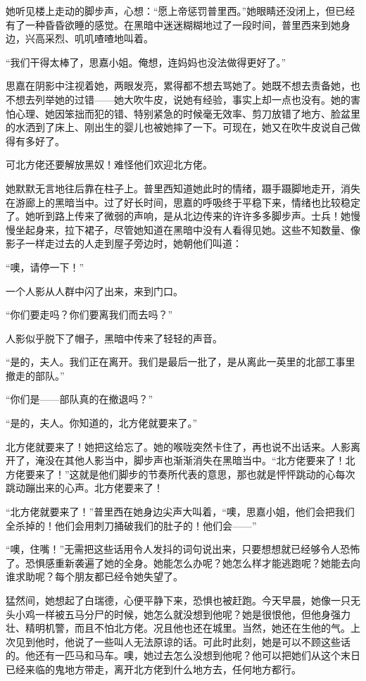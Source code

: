 \par 她听见楼上走动的脚步声，心想：“愿上帝惩罚普里西。”她眼睛还没闭上，但已经有了一种昏昏欲睡的感觉。在黑暗中迷迷糊糊地过了一段时间，普里西来到她身边，兴高采烈、叽叽喳喳地叫着。
\par “我们干得太棒了，思嘉小姐。俺想，连妈妈也没法做得更好了。”
\par 思嘉在阴影中注视着她，两眼发亮，累得都不想去骂她了。她既不想去责备她，也不想去列举她的过错——她大吹牛皮，说她有经验，事实上却一点也没有。她的害怕心理、她因笨拙而犯的错、特别紧急的时候毫无效率、剪刀放错了地方、脸盆里的水洒到了床上、刚出生的婴儿也被她摔了一下。可现在，她又在吹牛皮说自己做得有多好了。
\par 可北方佬还要解放黑奴！难怪他们欢迎北方佬。
\par 她默默无言地往后靠在柱子上。普里西知道她此时的情绪，蹑手蹑脚地走开，消失在游廊上的黑暗当中。过了好长时间，思嘉的呼吸终于平稳下来，情绪也比较稳定了。她听到路上传来了微弱的声响，是从北边传来的许许多多脚步声。士兵！她慢慢坐起身来，拉下裙子，尽管她知道在黑暗中没有人看得见她。这些不知数量、像影子一样走过去的人走到屋子旁边时，她朝他们叫道：
\par “噢，请停一下！”
\par 一个人影从人群中闪了出来，来到门口。
\par “你们要走吗？你们要离我们而去吗？”
\par 人影似乎脱下了帽子，黑暗中传来了轻轻的声音。
\par “是的，夫人。我们正在离开。我们是最后一批了，是从离此一英里的北部工事里撤走的部队。”
\par “你们是——部队真的在撤退吗？”
\par “是的，夫人。你知道的，北方佬就要来了。”
\par 北方佬就要来了！她把这给忘了。她的喉咙突然卡住了，再也说不出话来。人影离开了，淹没在其他人影当中，脚步声也渐渐消失在黑暗当中。“北方佬要来了！北方佬要来了！”这就是他们脚步的节奏所代表的意思，那也就是怦怦跳动的心每次跳动蹦出来的心声。北方佬要来了！
\par “北方佬就要来了！”普里西在她身边尖声大叫着，“噢，思嘉小姐，他们会把我们全杀掉的！他们会用刺刀捅破我们的肚子的！他们会——”
\par “噢，住嘴！”无需把这些话用令人发抖的词句说出来，只要想想就已经够令人恐怖了。恐惧感重新袭遍了她的全身。她能怎么办呢？她怎么样才能逃跑呢？她能去向谁求助呢？每个朋友都已经令她失望了。
\par 猛然间，她想起了白瑞德，心便平静下来，恐惧也被赶跑。今天早晨，她像一只无头小鸡一样被五马分尸的时候，她怎么就没想到他呢？她是很恨他，但他身强力壮、精明机警，而且不怕北方佬。况且他也还在城里。当然，她还在生他的气。上次见到他时，他说了一些叫人无法原谅的话。可此时此刻，她是可以不顾这些话的。他还有一匹马和马车。噢，她过去怎么没想到他呢？他可以把她们从这个末日已经来临的鬼地方带走，离开北方佬到什么地方去，任何地方都行。

